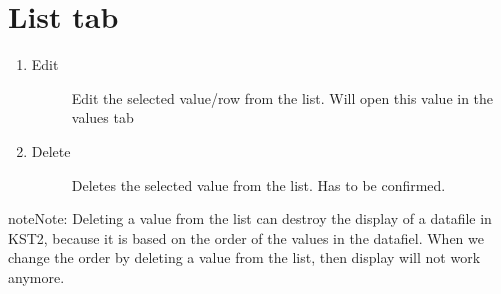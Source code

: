 \documentclass[a4paper,10pt,english]{sphinxmanual}
\begin{document}
\chapter{List tab}
\label{\detokenize{list:list-tab}}\label{\detokenize{list::doc}}
\begin{enumerate}
%
\item {} \begin{description}
\item[{Edit}] \leavevmode
Edit the selected value/row from the list. Will open this value in the values tab

\end{description}

\item {} \begin{description}
\item[{Delete}] \leavevmode
Deletes the selected value from the list. Has to be confirmed.

\end{description}

\end{enumerate}

\begin{sphinxadmonition}{note}{Note:}
Deleting a value from the list can destroy the display of a datafile in KST2,
because it is based on the order of the values in the datafiel. When we change the
order by deleting a value from the list, then display will not work anymore.
\end{sphinxadmonition}
\end{document}
